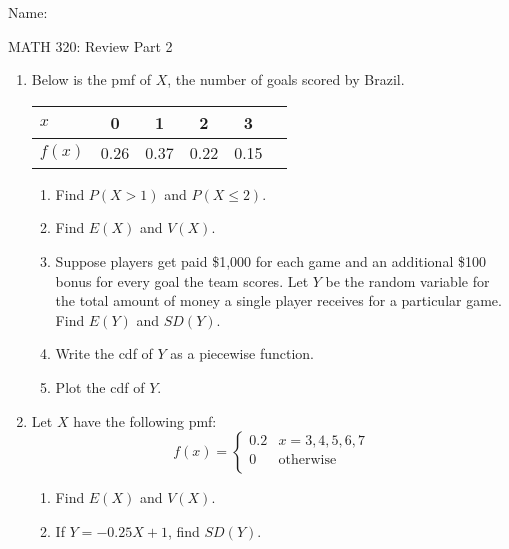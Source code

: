 \documentclass{article}
\begin{document}
\hspace{375pt}Name:

\begin{center}
{\Huge MATH 320: Review Part 2}

\end{center}


\bigskip\bigskip

\begin{enumerate}
    \item Below is the pmf of $X$, the number of goals scored by Brazil.\bigskip\\
    \begin{tabular}{| l || c | c | c | c | c |}
        \hline
        $x$ & 0 & 1 & 2 & 3\\
        \hline
        $f(x)$ & 0.26 & 0.37 & 0.22 & 0.15\\
        \hline
    \end{tabular}\bigskip
    \begin{enumerate}
        \item Find $P(X > 1)$ and $P(X \le 2)$.\vspace{40pt}
        \item Find $E(X)$ and $V(X)$.\vspace{70pt}
        \item Suppose players get paid \$1,000 for each game and an additional \$100 bonus for every goal the team scores. Let $Y$ be the random variable for the total amount of money a single player receives for a particular game. Find $E(Y)$ and $SD(Y)$.\vspace{80pt}
        \item Write the cdf of $Y$ as a piecewise function.\vspace{130pt}
        \item Plot the cdf of $Y$.\vspace{100pt}
    \end{enumerate}\bigskip
    
    \item Let $X$ have the following pmf: 
    \[
    f(x) =
        \left\{
        \begin{array}{ll}
             0.2 & x = 3, 4, 5, 6, 7\\
             0 & \text{otherwise}\\
        \end{array}
        \right.
    \]
    \begin{enumerate}
        \item Find $E(X)$ and $V(X)$.\vspace{70pt}
        \item If $Y = -0.25X + 1$, find $SD(Y)$.\vspace{50pt}
    \end{enumerate}
    

\end{enumerate}
\end{document}
